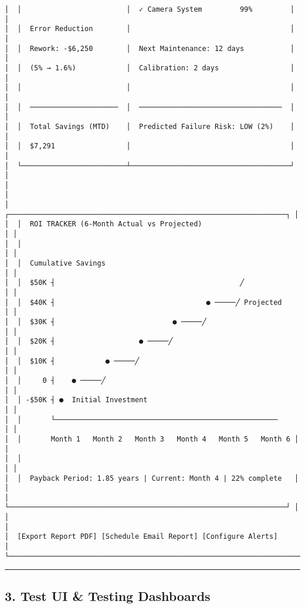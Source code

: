 \documentclass[
]{article}
\begin{document}
\begin{verbatim}
│  │                         │  ✓ Camera System         99%         │   │
│  │  Error Reduction        │                                      │   │
│  │  Rework: -$6,250        │  Next Maintenance: 12 days           │   │
│  │  (5% → 1.6%)            │  Calibration: 2 days                 │   │
│  │                         │                                      │   │
│  │  ─────────────────────  │  ──────────────────────────────────  │   │
│  │  Total Savings (MTD)    │  Predicted Failure Risk: LOW (2%)    │   │
│  │  $7,291                 │                                      │   │
│  └─────────────────────────┴──────────────────────────────────────┘   │
│                                                                        │
│  ┌──────────────────────────────────────────────────────────────────┐ │
│  │  ROI TRACKER (6-Month Actual vs Projected)                       │ │
│  │                                                                   │ │
│  │  Cumulative Savings                                              │ │
│  │  $50K ┤                                            ╱             │ │
│  │  $40K ┤                                    ● ─────╱ Projected    │ │
│  │  $30K ┤                            ● ─────╱                      │ │
│  │  $20K ┤                    ● ─────╱                              │ │
│  │  $10K ┤            ● ─────╱                                      │ │
│  │     0 ┤    ● ─────╱                                              │ │
│  │ -$50K ┤ ●  Initial Investment                                    │ │
│  │       └─────────────────────────────────────────────────────     │ │
│  │       Month 1   Month 2   Month 3   Month 4   Month 5   Month 6 │ │
│  │                                                                   │ │
│  │  Payback Period: 1.85 years | Current: Month 4 | 22% complete   │ │
│  └──────────────────────────────────────────────────────────────────┘ │
│                                                                        │
│  [Export Report PDF] [Schedule Email Report] [Configure Alerts]       │
└────────────────────────────────────────────────────────────────────────┘
\end{verbatim}

\begin{center}\rule{0.5\linewidth}{0.5pt}\end{center}

\hypertarget{test-ui-testing-dashboards}{%
\subsection{3. Test UI \& Testing
Dashboards}\label{test-ui-testing-dashboards}}
\end{document}
